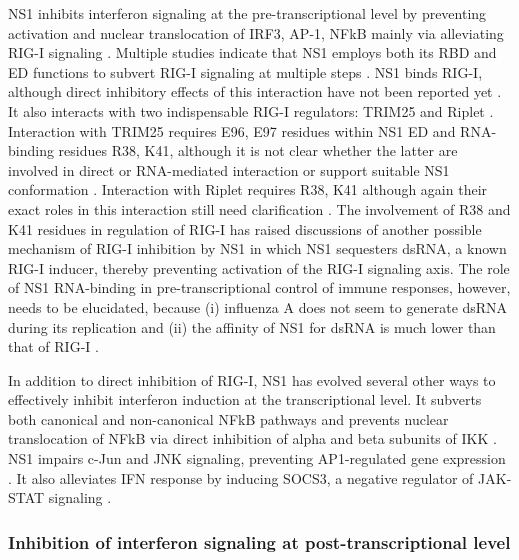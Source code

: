 		
		\gls{NS1} inhibits interferon signaling at the pre-transcriptional level by preventing activation and nuclear translocation of IRF3, AP-1, NFkB mainly via alleviating \gls{RIG-I} signaling \parencite{Talon2000, Ludwig2002, Wang2000, Geiss2002, Munir2012}. Multiple studies indicate that NS1 employs both its \gls{RBD} and \gls{ED} functions to subvert \gls{RIG-I} signaling at multiple steps \parencite{Haye2009, Ludwig2002, Tisoncik2011, Wang2000}. NS1 binds \gls{RIG-I}, although direct inhibitory effects of this interaction have not been reported yet \parencite{Opitz2007, Mibayashi2007a}. It also interacts with two indispensable \gls{RIG-I} regulators: TRIM25 and Riplet \parencite{Gack2009, Rajsbaum2012}. Interaction with TRIM25 requires E96, E97 residues within NS1 ED and RNA-binding residues R38, K41, although it is not clear whether the latter are involved in direct or RNA-mediated interaction or support suitable NS1 conformation \parencite{Gack2009}. Interaction with Riplet requires R38, K41 although again their exact roles in this interaction still need clarification \parencite{Rajsbaum2012}. The involvement of R38 and K41 residues in regulation of RIG-I has raised discussions of another possible mechanism of RIG-I inhibition by NS1 in which NS1 sequesters dsRNA, a known RIG-I inducer, thereby preventing activation of the RIG-I signaling axis. The role of NS1 RNA-binding in pre-transcriptional control   of immune responses, however, needs to be elucidated, because (i) influenza A does not seem to generate dsRNA during its replication \parencite{Wisskirchen2011} and (ii) the affinity of NS1 for dsRNA is much lower than that of RIG-I \parencite{Chien2004, Yin2007, Vela2012}.
		
		In addition to direct inhibition of RIG-I, NS1 has evolved several other ways to  effectively inhibit interferon induction at the transcriptional level. It subverts both canonical and non-canonical \gls{NFkB} pathways \parencite{Ruckle2012} and prevents nuclear translocation of \gls{NFkB} via direct inhibition of alpha and beta subunits of \gls{IKK} \parencite{Gao2012}. \gls{NS1} impairs c-Jun and JNK signaling, preventing \gls{AP1}-regulated gene expression \parencite{Ludwig2002}. It also alleviates IFN response by inducing \gls{SOCS3}, a negative regulator of \gls{JAK}-STAT signaling \parencite{Pauli2008}. 
		
		\subsubsection{Inhibition of interferon signaling at post-transcriptional level} \label{sec:pre-transcr}
		
